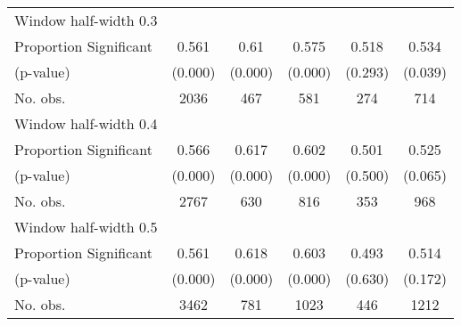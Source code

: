 \begin{tabular}{l*{5}{c}}
\hline
Window half-width 0.3\\

Proportion Significant& 0.561 &  0.61 &  0.575 &  0.518 &  0.534\\

(p-value) & (0.000) &  (0.000) &  (0.000) &  (0.293) &  (0.039)\\

No. obs.& 2036 &  467 &  581 &  274 &  714\\

\hline
Window half-width 0.4\\

Proportion Significant& 0.566 &  0.617 &  0.602 &  0.501 &  0.525\\

(p-value) & (0.000) &  (0.000) &  (0.000) &  (0.500) &  (0.065)\\

No. obs.& 2767 &  630 &  816 &  353 &  968\\

\hline
Window half-width 0.5\\

Proportion Significant& 0.561 &  0.618 &  0.603 &  0.493 &  0.514\\

(p-value) & (0.000) &  (0.000) &  (0.000) &  (0.630) &  (0.172)\\

No. obs.& 3462 &  781 &  1023 &  446 &  1212\\

\hline\hline
\end{tabular}

